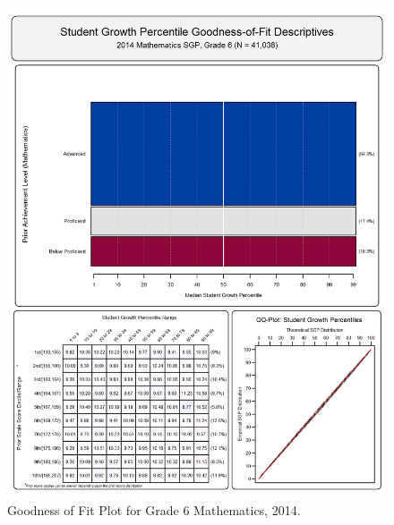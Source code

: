 \documentclass[12pt]{article}
\begin{document}
\begin{figure}[htbp]
\centering
\includegraphics{../img/Goodness_of_Fit/MATHEMATICS.2014/2014_MATH_6;2013_MATH_5;2012_MATH_4;2011_MATH_3.png}
\caption{Goodness of Fit Plot for Grade 6 Mathematics, 2014.}
\end{figure}
\end{document}
